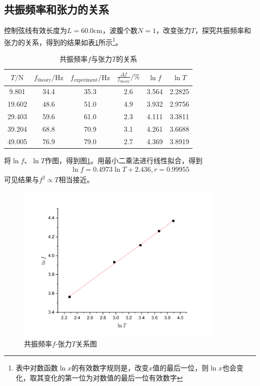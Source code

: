 \documentclass{ctexart}
\begin{document}
	\subsection{共振频率和张力的关系}
	控制弦线有效长度为$L=60.0\mathrm{cm}$，波腹个数$N=1$，改变张力$T$，探究共振频率和张力的关系，得到的结果如表\ref{tab:f-T}所示\footnote{表中对数函数$\ln{x}$的有效数字规则是，改变$x$值的最后一位，则$\ln{x}$也会变化，取其变化的第一位为对数值的最后一位有效数字}。
	\begin{table}[H]
		\begin{center}
			\caption{共振频率$f$与张力$T$的关系}
			\begin{tabular}{cccccc}
				\toprule
				$T/\mathrm{N}$&$f_\text{theory}/\mathrm{Hz}$&$f_\text{experiment}/\mathrm{Hz}$&$\frac{\Delta f}{f_\text{theory}}/\%$&$\ln{f}$&$\ln{T}$\\
				\midrule
				9.801&34.4&35.3&2.6&3.564&2.2825\\
				19.602&48.6&51.0&4.9&3.932&2.9756\\
				29.403&59.6&61.0&2.3&4.111&3.3811\\
				39.204&68.8&70.9&3.1&4.261&3.6688\\
				49.005&76.9&79.0&2.7&4.369&3.8919\\
				\bottomrule
			\end{tabular}
			\label{tab:f-T}
		\end{center}
	\end{table}
	将$\ln{f}$、$\ln{T}$作图，得到图\ref{fig:f-T}。用最小二乘法进行线性拟合，得到
	\begin{align}
		\ln{f}=0.4973\ln{T}+2.436,r=0.99955
	\end{align}
	可见结果与$f^2\propto T$相当接近。
	\begin{figure}[H]
		\centering
		\includegraphics[width=10cm]{fT.png}
		\caption{共振频率$f$-张力$T$关系图}
		\label{fig:f-T}
	\end{figure}
\end{document}
